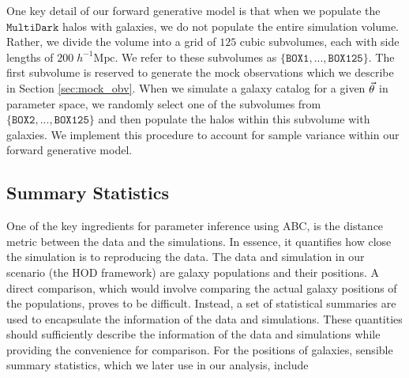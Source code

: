 One key detail of our forward generative model is that when we populate the $\mathtt{MultiDark}$ halos 
with galaxies, we do not populate the entire simulation volume. Rather, we divide the volume into a 
grid of $125$ cubic subvolumes, each with side lengths of $200\;h^{-1}\mathrm{Mpc}$. We refer to these 
subvolumes as $\{\mathtt{BOX1}, ..., \mathtt{BOX125}\}$. 
The first subvolume is reserved to generate the mock observations which we describe in Section 
\ref{sec:mock_obv}. When we simulate a galaxy catalog for a given $\vec{\theta}$ in parameter space, 
we randomly select one of the subvolumes from $\{\mathtt{BOX2}, ..., \mathtt{BOX125}\}$ and then 
populate the halos within this subvolume with galaxies. 
We implement this procedure to account for sample variance within our forward generative model. 

\subsection{Summary Statistics}\label{sec:statistics}
One of the key ingredients for parameter inference using ABC, is the distance metric between 
the data and the simulations. In essence, it quantifies how close the simulation 
is to reproducing the data. The data and simulation in our scenario (the HOD framework) 
are galaxy populations and their positions. A direct comparison, which would involve comparing 
the actual galaxy positions of the populations, proves to be difficult. 
Instead, a set of statistical summaries are used to encapsulate the information of the data 
and simulations. These quantities should sufficiently describe the information of the data
and simulations while providing the convenience for comparison. 
For the positions of galaxies, sensible summary statistics, 
which we later use in our analysis, include

